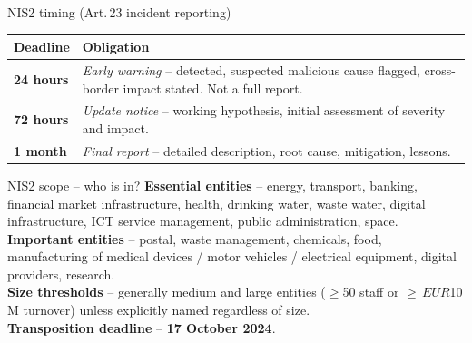 \documentclass[10pt,a4paper,landscape]{article}
\begin{document}
\begin{minipage}[t]{0.48\linewidth}
\begin{panel}{NIS2 timing (Art.\,23 incident reporting)}
\small
\begin{tabular}{p{2.6cm} p{8.3cm}}
\toprule
\textbf{Deadline} & \textbf{Obligation} \\
\midrule
\textbf{24 hours}  & \emph{Early warning} -- detected, suspected malicious cause flagged, cross-border impact stated. Not a full report. \\
\textbf{72 hours}  & \emph{Update notice} -- working hypothesis, initial assessment of severity and impact. \\
\textbf{1 month}   & \emph{Final report} -- detailed description, root cause, mitigation, lessons. \\
\bottomrule
\end{tabular}
\end{panel}

\vspace{2mm}
\begin{panel}{NIS2 scope -- who is in?}
\small
\textbf{Essential entities} -- energy, transport, banking, financial market infrastructure, health, drinking water, waste water, digital infrastructure, ICT service management, public administration, space.\\[2pt]
\textbf{Important entities} -- postal, waste management, chemicals, food, manufacturing of medical devices / motor vehicles / electrical equipment, digital providers, research.\\[2pt]
\textbf{Size thresholds} -- generally medium and large entities ($\geq$50 staff or $\geq$\,$EUR$10\,M turnover) unless explicitly named regardless of size.\\[2pt]
\textbf{Transposition deadline} -- \textbf{17 October 2024}.
\end{panel}
\end{minipage}\hfill
\end{document}
